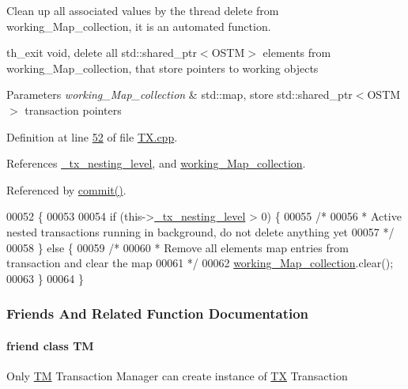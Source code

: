 Clean up all associated values by the thread delete from working\+\_\+\+Map\+\_\+collection, it is an automated function. 

th\+\_\+exit void, delete all std\+::shared\+\_\+ptr$<$\+O\+S\+T\+M$>$ elements from working\+\_\+\+Map\+\_\+collection, that store pointers to working objects


\begin{DoxyParams}{Parameters}
{\em working\+\_\+\+Map\+\_\+collection} & std\+::map, store std\+::shared\+\_\+ptr$<$\+O\+S\+T\+M$>$ transaction pointers \\
\hline
\end{DoxyParams}


Definition at line \hyperlink{_t_x_8cpp_source_l00052}{52} of file \hyperlink{_t_x_8cpp_source}{T\+X.\+cpp}.



References \hyperlink{_t_x_8h_source_l00102}{\+\_\+tx\+\_\+nesting\+\_\+level}, and \hyperlink{_t_x_8h_source_l00092}{working\+\_\+\+Map\+\_\+collection}.



Referenced by \hyperlink{_t_x_8cpp_source_l00202}{commit()}.


\begin{DoxyCode}
00052                  \{
00053 
00054     \textcolor{keywordflow}{if} (this->\hyperlink{class_t_x_ae8f413fd7f4fea322e7ad3c668f9898e_ae8f413fd7f4fea322e7ad3c668f9898e}{\_tx\_nesting\_level} > 0) \{
00055         \textcolor{comment}{/*}
00056 \textcolor{comment}{         * Active nested transactions running in background, do not delete anything yet
}
00057 \textcolor{comment}{         */}
00058     \} \textcolor{keywordflow}{else} \{
00059         \textcolor{comment}{/* 
}
00060 \textcolor{comment}{         * Remove all elements map entries from transaction and clear the map
}
00061 \textcolor{comment}{         */}
00062         \hyperlink{class_t_x_a81aafda16e2f20e36ec6c68e584668ff_a81aafda16e2f20e36ec6c68e584668ff}{working\_Map\_collection}.clear();
00063     \}
00064 \}
\end{DoxyCode}


\subsubsection{Friends And Related Function Documentation}
\paragraph[{\texorpdfstring{TM}{TM}}]{\setlength{\rightskip}{0pt plus 5cm}friend class {\bf TM}\hspace{0.3cm}{\ttfamily [friend]}}\hypertarget{class_t_x_adf1ccda799ef5c419cb43b8ae55eb45c_adf1ccda799ef5c419cb43b8ae55eb45c}{}\label{class_t_x_adf1ccda799ef5c419cb43b8ae55eb45c_adf1ccda799ef5c419cb43b8ae55eb45c}
Only \hyperlink{class_t_m}{TM} Transaction Manager can create instance of \hyperlink{class_t_x}{TX} Transaction 

